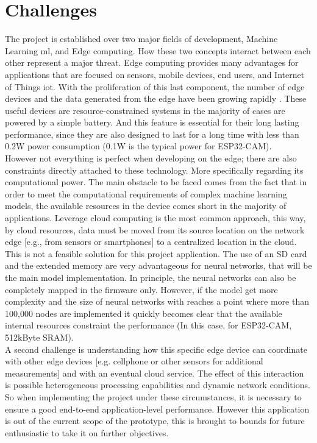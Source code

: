 \section{Challenges}
The project is established over two major fields of development, Machine Learning \ac{ml}, and Edge computing. How these two concepts interact between each other represent a major threat. Edge computing provides many advantages for applications that are focused on sensors, mobile devices, end users, and Internet of Things \ac{iot}. With the proliferation of this last component, the number of edge devices and the data generated from the edge have been growing rapidly \autocite{Shi:2019}. These useful devices are resource-constrained systems in the majority of cases are powered by a simple battery. And this feature is essential for their long lasting performance, since they are also designed to last for a long time with less than 0.2W power consumption (0.1W is the typical power for ESP32-CAM).\\

However not everything is perfect when developing on the edge; there are also constraints directly attached to these technology. More specifically regarding its computational power. The main obstacle to be faced comes from the fact that in order to meet the computational requirements of complex machine learning models, the available resources in the device comes short in the majority of applications. Leverage cloud computing is the most common approach, this way, by cloud resources, data must be moved from its source location on the network edge [e.g., from sensors or smartphones] to a centralized location in the cloud.\autocite{Chen:2019} This is not a feasible solution for this project application. The use of an SD card and the extended memory are very advantageous for neural networks, that will be the main model implementation. In principle, the neural networks can also be completely mapped in the firmware only. However, if the model get more complexity and the size of neural networks with reaches a point where more than 100,000 nodes are implemented it quickly becomes clear that the available internal resources constraint the performance (In this case, for ESP32-CAM, 512kByte SRAM). \autocite{Muller:2020}\\
 
A second challenge is understanding how this specific edge device can coordinate with other edge devices [e.g. cellphone or other sensors for additional measurements] and with an eventual cloud service. The effect of this interaction is possible heterogeneous processing capabilities and dynamic network conditions. So when implementing the project under these circumstances, it is necessary to ensure a good end-to-end application-level performance. However this application is out of the current scope of the prototype, this is brought to bounds for future enthusiastic to take it on further objectives. \\

